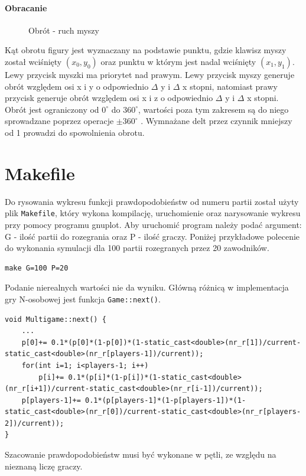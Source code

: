 \paragraph{Obracanie}
\begin{figure}
    \centering
    \caption{Obrót - ruch myszy}
	\label{fig:obrot} 
\end{figure}
Kąt obrotu figury \cite{Tut} jest wyznaczany na podstawie punktu, gdzie klawisz myszy został wciśnięty $(x_0,y_0)$ oraz punktu w którym jest nadal wciśnięty $(x_1,y_1)$.
Lewy przycisk myszki ma priorytet nad prawym. Lewy przycisk myszy generuje obrót względem osi x i y o odpowiednio $\Delta$ y i $\Delta$ x stopni, natomiast prawy przycisk generuje obrót względem osi x i z o odpowiednio $\Delta$ y i $\Delta$ x stopni. Obrót jest ograniczony od $0^\circ$ do $360^\circ$, wartości poza tym zakresem są do niego sprowadzane poprzez operacje $\pm 360^\circ$ . Wymnażane delt przez czynnik mniejszy od 1 prowadzi do spowolnienia obrotu.



\section{Makefile}
\label{sec::makefile}
Do rysowania wykresu funkcji prawdopodobieństw od numeru partii został użyty plik \texttt{Makefile}, który wykona kompilację, uruchomienie oraz narysowanie wykresu przy pomocy programu gnuplot. Aby uruchomić program należy podać argument: G - ilość partii do rozegrania oraz P - ilość graczy. Poniżej przykładowe polecenie do wykonania symulacji dla 100 partii rozegranych przez 20 zawodników.
\begin{verbatim}
make G=100 P=20
\end{verbatim}
Podanie nierealnych wartości nie da wyniku. Główną różnicą w implementacja gry N-osobowej jest funkcja \texttt{Game::next()}.
\begin{lstlisting}
void Multigame::next() {
    ...
    p[0]+= 0.1*(p[0]*(1-p[0])*(1-static_cast<double>(nr_r[1])/current-static_cast<double>(nr_r[players-1])/current));
    for(int i=1; i<players-1; i++)
        p[i]+= 0.1*(p[i]*(1-p[i])*(1-static_cast<double>(nr_r[i+1])/current-static_cast<double>(nr_r[i-1])/current));
    p[players-1]+= 0.1*(p[players-1]*(1-p[players-1])*(1-static_cast<double>(nr_r[0])/current-static_cast<double>(nr_r[players-2])/current));
}
\end{lstlisting}
Szacowanie prawdopodobieństw musi być wykonane w pętli, ze względu na nieznaną liczę graczy.